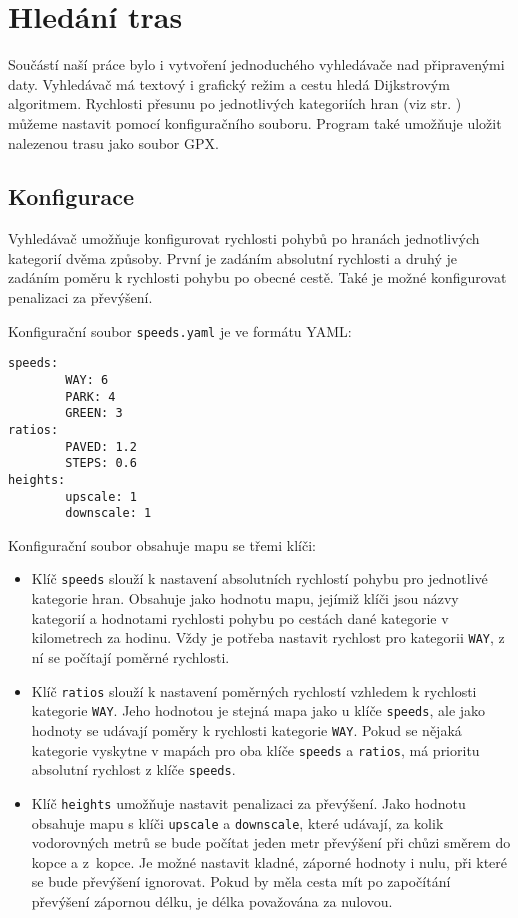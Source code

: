 \chapter{Hledání tras}
Součástí naší práce bylo i vytvoření jednoduchého vyhledávače nad připravenými
daty. Vyhledávač má textový i grafický režim a cestu hledá Dijkstrovým
algoritmem. Rychlosti přesunu po jednotlivých kategoriích hran (viz str.
\pageref{label:kategorie}) můžeme nastavit pomocí konfiguračního souboru.
Program také umožňuje uložit nalezenou trasu jako soubor GPX. \cite{gpxspec}  

\section{Konfigurace}
Vyhledávač umožňuje konfigurovat rychlosti pohybů po hranách jednotlivých
kategorií dvěma způsoby. První je zadáním absolutní rychlosti a druhý je zadáním
poměru k rychlosti pohybu po obecné cestě. Také je možné konfigurovat penalizaci
za převýšení.

Konfigurační soubor \verb|speeds.yaml| je ve formátu YAML: \cite{yamlspec} 
\begin{verbatim}
speeds:
        WAY: 6
        PARK: 4
        GREEN: 3
ratios:
        PAVED: 1.2
        STEPS: 0.6
heights:
        upscale: 1
        downscale: 1
\end{verbatim}
Konfigurační soubor obsahuje mapu se třemi klíči:
\begin{itemize}
	\item Klíč \verb|speeds| slouží k nastavení absolutních rychlostí pohybu
	pro jednotlivé kategorie hran. Obsahuje jako hodnotu mapu, jejímiž klíči jsou
	názvy kategorií a hodnotami rychlosti pohybu po cestách dané kategorie v
	kilometrech za hodinu. Vždy je potřeba nastavit rychlost pro kategorii
	\verb|WAY|, z ní se počítají poměrné rychlosti.
	\item Klíč \verb|ratios| slouží k nastavení poměrných rychlostí vzhledem
	k rychlosti kategorie \verb|WAY|. Jeho hodnotou je stejná mapa jako u
	klíče \verb|speeds|, ale jako hodnoty se udávají poměry k rychlosti
	kategorie \verb|WAY|. Pokud se nějaká kategorie vyskytne v mapách pro
	oba klíče \verb|speeds| a \verb|ratios|, má prioritu absolutní rychlost
	z klíče \verb|speeds|.
	\item Klíč \verb|heights| umožňuje nastavit penalizaci za převýšení.
	Jako hodnotu obsahuje mapu s klíči \verb|upscale| a \verb|downscale|,
	které udávají, za kolik vodorovných metrů se bude počítat jeden metr
	převýšení při chůzi směrem do kopce a z~kopce. Je možné nastavit kladné,
	záporné hodnoty i nulu, při které se bude převýšení ignorovat. Pokud by
	měla cesta mít po započítání převýšení zápornou délku, je délka
	považována za nulovou.
\end{itemize}

